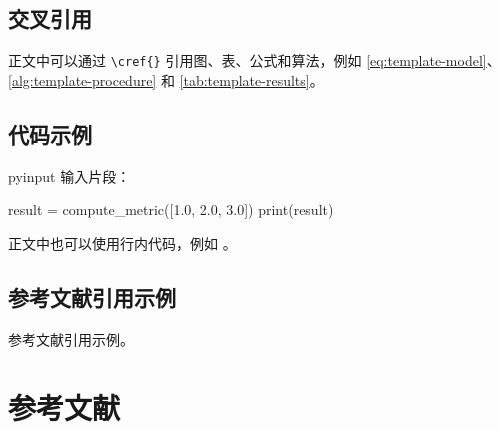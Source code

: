 \documentclass[exp]{hitrep}
\begin{document}
\subsection{交叉引用}
正文中可以通过 \verb|\cref{}| 引用图、表、公式和算法，例如 \cref{eq:template-model}、\cref{alg:template-procedure} 和 \cref{tab:template-results}。

\subsection{代码示例}

pyinput 输入片段：

\begin{pyinput}
result = compute_metric([1.0, 2.0, 3.0])
print(result)
\end{pyinput}

正文中也可以使用行内代码，例如 。

\subsection{参考文献引用示例}
参考文献引用示例\cite{knuth1984texbook,lamport1994latex}。

\section{参考文献}

\end{document}
